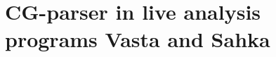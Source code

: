 \documentclass[11pt]{article}
\begin{document}
%



\section{CG-parser in live analysis programs Vasta and Sahka}\label{vastasahka}



\end{document}
